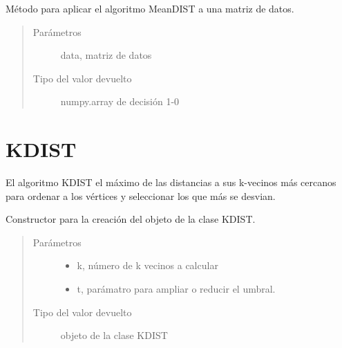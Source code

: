 \documentclass[letterpaper,10pt,spanish]{sphinxmanual}
\begin{document}

\begin{fulllineitems}
Método para aplicar el algoritmo MeanDIST a una matriz de datos.
\begin{quote}\begin{description}
\item[{Parámetros}] \leavevmode
{} \textendash{} data, matriz de datos

\item[{Tipo del valor devuelto}] \leavevmode
numpy.array de decisión 1-0

\end{description}\end{quote}

\end{fulllineitems}



\chapter{KDIST}
\label{\detokenize{index:kdist}}
El algoritmo KDIST el máximo de las distancias a
sus k-vecinos más cercanos para ordenar a los vértices y
seleccionar los que más se desvian.

\begin{fulllineitems}
\label{\detokenize{index:KDIST}}
Constructor para la creación del objeto de la clase KDIST.
\begin{quote}\begin{description}
\item[{Parámetros}] \leavevmode\begin{itemize}
\item {} 
 \textendash{} k, número de k vecinos a calcular

\item {} 
 \textendash{} t, parámatro para ampliar o reducir el umbral.

\end{itemize}

\item[{Tipo del valor devuelto}] \leavevmode
objeto de la clase KDIST

\end{description}\end{quote}

\end{fulllineitems}
\end{document}
